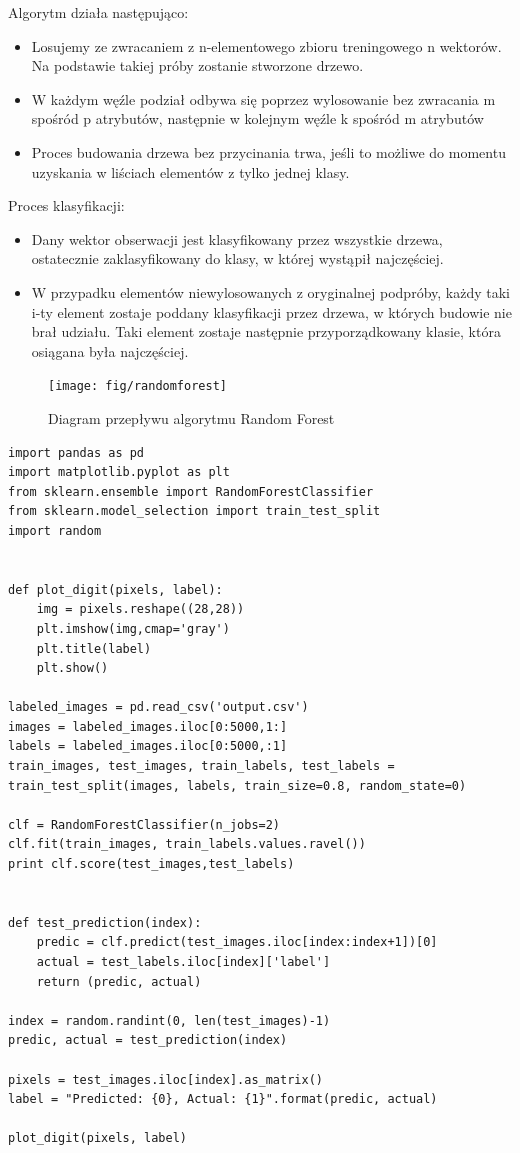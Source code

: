\documentclass[brudnopis]{xmgr}
\begin{document}
Algorytm działa następująco:
\begin{itemize}
\item
Losujemy ze zwracaniem z n-elementowego zbioru treningowego n wektorów. Na podstawie takiej próby zostanie stworzone drzewo.
\item
W każdym węźle podział odbywa się poprzez wylosowanie bez zwracania m spośród p atrybutów, następnie w kolejnym węźle k spośród m atrybutów
\item
Proces budowania drzewa bez przycinania trwa, jeśli to możliwe do momentu uzyskania w liściach elementów z tylko jednej klasy.
\end{itemize}

Proces klasyfikacji:
\begin{itemize}
\item
Dany wektor obserwacji jest klasyfikowany przez wszystkie drzewa, ostatecznie zaklasyfikowany do klasy, w której wystąpił najczęściej.
\item
W przypadku elementów niewylosowanych z oryginalnej podpróby, każdy taki i-ty element zostaje poddany klasyfikacji przez drzewa, w których budowie nie brał udziału. Taki element zostaje następnie przyporządkowany klasie, która osiągana była najczęściej.
\end{itemize}

\begin{figure}[!tbh]
\centering
\texttt{[image: fig/randomforest]}
\caption{Diagram przepływu algorytmu Random Forest}
\end{figure}
\newpage

\begin{lstlisting}
import pandas as pd
import matplotlib.pyplot as plt
from sklearn.ensemble import RandomForestClassifier
from sklearn.model_selection import train_test_split
import random


def plot_digit(pixels, label):
    img = pixels.reshape((28,28))
    plt.imshow(img,cmap='gray')
    plt.title(label)
    plt.show()

labeled_images = pd.read_csv('output.csv')
images = labeled_images.iloc[0:5000,1:]
labels = labeled_images.iloc[0:5000,:1]
train_images, test_images, train_labels, test_labels = train_test_split(images, labels, train_size=0.8, random_state=0)

clf = RandomForestClassifier(n_jobs=2)
clf.fit(train_images, train_labels.values.ravel())
print clf.score(test_images,test_labels)


def test_prediction(index):
    predic = clf.predict(test_images.iloc[index:index+1])[0]
    actual = test_labels.iloc[index]['label']
    return (predic, actual)

index = random.randint(0, len(test_images)-1)
predic, actual = test_prediction(index)

pixels = test_images.iloc[index].as_matrix()
label = "Predicted: {0}, Actual: {1}".format(predic, actual)

plot_digit(pixels, label)
\end{lstlisting}
\end{document}
